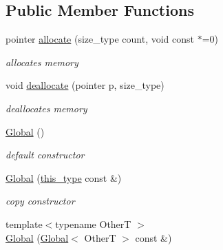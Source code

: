 \subsection*{Public Member Functions}
\begin{DoxyCompactItemize}
\item 
\hypertarget{classhryky_1_1allocator_1_1_global_aae1ae39c4995899fd947be05e6f9f01d}{pointer \hyperlink{classhryky_1_1allocator_1_1_global_aae1ae39c4995899fd947be05e6f9f01d}{allocate} (size\-\_\-type count, void const $\ast$=0)}\label{classhryky_1_1allocator_1_1_global_aae1ae39c4995899fd947be05e6f9f01d}

\begin{DoxyCompactList}\small\item\em allocates memory \end{DoxyCompactList}\item 
\hypertarget{classhryky_1_1allocator_1_1_global_a4dc7039bfb8a8102061d0c2d21e47b00}{void \hyperlink{classhryky_1_1allocator_1_1_global_a4dc7039bfb8a8102061d0c2d21e47b00}{deallocate} (pointer p, size\-\_\-type)}\label{classhryky_1_1allocator_1_1_global_a4dc7039bfb8a8102061d0c2d21e47b00}

\begin{DoxyCompactList}\small\item\em deallocates memory \end{DoxyCompactList}\item 
\hypertarget{classhryky_1_1allocator_1_1_global_a1d70a7809c773c829cbc617382d8c721}{\hyperlink{classhryky_1_1allocator_1_1_global_a1d70a7809c773c829cbc617382d8c721}{Global} ()}\label{classhryky_1_1allocator_1_1_global_a1d70a7809c773c829cbc617382d8c721}

\begin{DoxyCompactList}\small\item\em default constructor \end{DoxyCompactList}\item 
\hypertarget{classhryky_1_1allocator_1_1_global_a0c86168f3bb0f998381c4816fd03b4d8}{\hyperlink{classhryky_1_1allocator_1_1_global_a0c86168f3bb0f998381c4816fd03b4d8}{Global} (\hyperlink{classhryky_1_1allocator_1_1_base}{this\-\_\-type} const \&)}\label{classhryky_1_1allocator_1_1_global_a0c86168f3bb0f998381c4816fd03b4d8}

\begin{DoxyCompactList}\small\item\em copy constructor \end{DoxyCompactList}\item 
\hypertarget{classhryky_1_1allocator_1_1_global_a5e30ac6e8e7c1192b7cea1fa962b64f2}{{\footnotesize template$<$typename Other\-T $>$ }\\\hyperlink{classhryky_1_1allocator_1_1_global_a5e30ac6e8e7c1192b7cea1fa962b64f2}{Global} (\hyperlink{classhryky_1_1allocator_1_1_global}{Global}$<$ Other\-T $>$ const \&)}\label{classhryky_1_1allocator_1_1_global_a5e30ac6e8e7c1192b7cea1fa962b64f2}


\end{DoxyCompactItemize}

